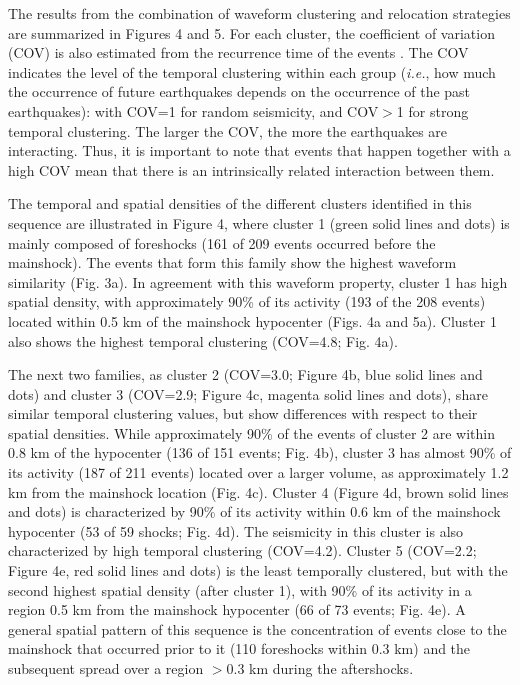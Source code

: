 \documentclass[a4paper,12pt,twoside]{article}
\begin{document}
The results from the combination of waveform clustering and relocation strategies are summarized in Figures 4 and 5. For each cluster, the coefficient of variation (COV) is also estimated from the recurrence time of the events \citep{Kagan_1991_LTE, Schoenball_2017_SAS}. The COV indicates the level of the temporal clustering within each group (\textit{i.e.}, how much the occurrence of future earthquakes depends on the occurrence of the past earthquakes): with COV=1 for random seismicity, and COV$>$1 for strong temporal clustering. The larger the COV, the more the earthquakes are interacting. Thus, it is important to note that events that happen together with a high COV mean that there is an intrinsically related interaction between them.

The temporal and spatial densities of the different clusters identified in this sequence are illustrated in Figure 4, where cluster 1 (green solid lines and dots) is mainly composed of foreshocks (161 of 209 events occurred before the mainshock). The events that form this family show the highest waveform similarity (Fig. 3a). In agreement with this waveform property, cluster 1 has high spatial density, with approximately 90\% of its activity (193 of the 208 events) located within 0.5 km of the mainshock hypocenter (Figs. 4a and 5a). Cluster 1 also shows the highest temporal clustering (COV=4.8; Fig. 4a).

The next two families, as cluster 2 (COV=3.0; Figure 4b, blue solid lines and dots) and cluster 3 (COV=2.9; Figure 4c, magenta solid lines and dots), share similar temporal clustering values, but show differences with respect to their spatial densities. While approximately 90\% of the events of cluster 2 are within 0.8 km of the hypocenter (136 of 151 events; Fig. 4b), cluster 3 has almost 90\% of its activity (187 of 211 events) located over a larger volume, as approximately 1.2 km from the mainshock location (Fig. 4c). Cluster 4 (Figure 4d, brown solid lines and dots) is characterized by 90\% of its activity within 0.6 km of the mainshock hypocenter (53 of 59 shocks; Fig. 4d). The seismicity in this cluster is also characterized by high temporal clustering (COV=4.2). Cluster 5 (COV=2.2; Figure 4e, red solid lines and dots) is the least temporally clustered, but with the second highest spatial density (after cluster 1), with 90\% of its activity in a region 0.5 km from the mainshock hypocenter (66 of 73 events; Fig. 4e). A general spatial pattern of this sequence is the concentration of events close to the mainshock that occurred prior to it (110 foreshocks within 0.3 km) and the subsequent spread over a region $>$0.3 km during the aftershocks.
\end{document}
